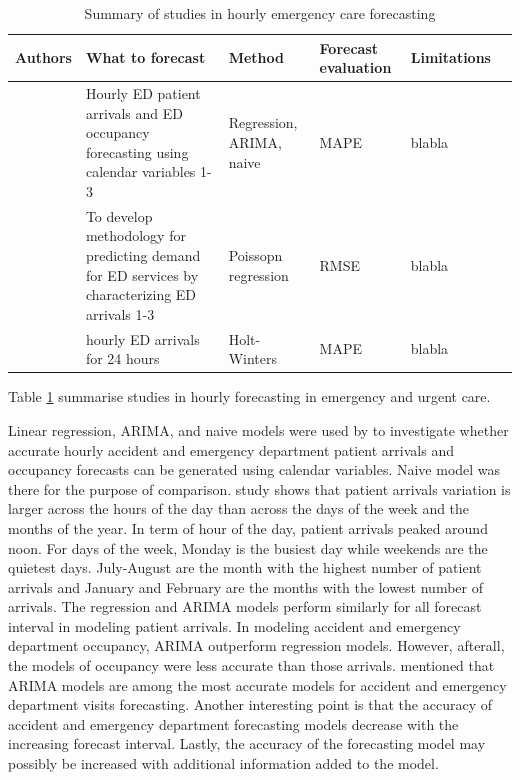 \documentclass[]{elsarticle} %
\begin{document}
\begin{table}[h]
\caption{Summary of studies in hourly emergency care forecasting} 
\centering 
\begin{adjustbox}{width=1\textwidth}
\small

\begin{tabular}{clllll} 
\hline
Authors & What to forecast & Method & Forecast evaluation & Limitations  \\ 
\hline 

\citet{hertzum2017forecasting} & Hourly ED patient arrivals and ED occupancy forecasting using calendar variables  1-3 & Regression, ARIMA, naive & MAPE & blabla\\ 
\citet{mccarthy2008challenge} & To develop methodology for predicting demand for ED services by characterizing ED arrivals  1-3 & Poissopn regression & RMSE & blabla\\ 
\citet{morzuch2006forecasting} & hourly ED arrivals for 24 hours & Holt-Winters & MAPE & blabla\\ 


\hline
\end{tabular}
\end{adjustbox}
\label{tab:lit-summary}
\end{table}

Table \ref{tab:lit-summary} summarise studies in hourly forecasting in emergency and urgent care.

Linear regression, ARIMA, and naive models were used by \citet{hertzum2017forecasting} to investigate whether accurate hourly accident and emergency department patient arrivals and occupancy forecasts can be generated using calendar variables. Naive model was there for the purpose of comparison. \citet{hertzum2017forecasting} study shows that patient arrivals variation is larger across the hours of the day than across the days of the week and the months of the year. In term of hour of the day, patient arrivals peaked around noon. For days of the week, Monday is the busiest day while weekends are the quietest days. July-August are the month with the highest number of patient arrivals and January and February are the months with the lowest number of arrivals. The regression and ARIMA models perform similarly for all forecast interval in modeling patient arrivals. In modeling accident and emergency department occupancy, ARIMA outperform regression models. However, afterall, the models of occupancy were less accurate than those arrivals. \citet{hertzum2017forecasting} mentioned that ARIMA models are among the most accurate models for accident and emergency department visits forecasting. Another interesting point is that the accuracy of accident and emergency department forecasting models decrease with the increasing forecast interval. Lastly, the accuracy of the forecasting model may possibly be increased with additional information added to the model.
\end{document}
